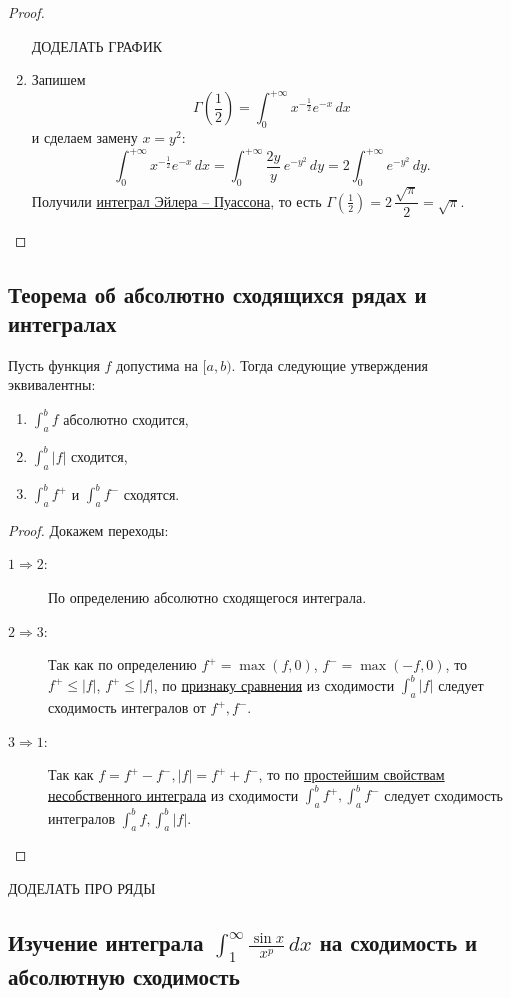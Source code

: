 \begin{proof}
\begin{enumerate}
		ДОДЕЛАТЬ ГРАФИК
		\item Запишем \[
			\Gamma \left(\frac{1}{2} \right) = \int_{0}^{+\infty} x^{-\frac{1}{2}} e^{-x} \, dx
		\]
		и сделаем замену \(x = y^2\): \[
			\int_{0}^{+\infty} x^{-\frac{1}{2}} e^{-x} \, dx = \int_{0}^{+\infty} \frac{2y}{y} \, e^{-y^2} \, dy = 2 \int_{0}^{+\infty} e^{-y^2} \, dy.
		\]
		Получили \hyperlink{puas}{интеграл Эйлера -- Пуассона}, то есть \(\Gamma \left(\frac{1}{2} \right) = 2 \, \dfrac{\sqrt{\pi}}{2} = \sqrt{\pi}\).
	\end{enumerate}
\end{proof}

\subsection{Теорема об абсолютно сходящихся рядах и интегралах}

\begin{theorem} \hypertarget{t42}{}
	Пусть функция \(f\) допустима на \([a, b)\). Тогда следующие утверждения эквивалентны:
	\begin{enumerate}
		\item \(\int_{a}^{b} f\) абсолютно сходится,
		\item \(\int_{a}^{b} |f|\) сходится,
		\item \(\int_{a}^{b} f^+\) и \(\int_{a}^{b} f^-\) сходятся.
	\end{enumerate} 
\end{theorem}
\begin{proof}
	Докажем переходы:
	\begin{description}
		\item[\(1 \Rightarrow 2\):] По определению абсолютно сходящегося интеграла.
		\item[\(2 \Rightarrow 3\):] Так как по определению \(f^+ = \max (f, 0)\), \(f^- = \max (-f, 0)\), то \(f^+ \leqslant |f|\), \(f^+ \leqslant |f|\), по \hyperlink{priz}{признаку сравнения} из сходимости \(\int_{a}^{b} |f|\) следует сходимость интегралов от \(f^+, f^-\).
		\item[\(3 \Rightarrow 1\):] Так как \(f = f^+ - f^-, |f| = f^+ + f^-\), то по \hyperlink{svva}{простейшим свойствам несобственного интеграла} из сходимости \(\int_{a}^{b} f^+, \int_{a}^{b} f^-\) следует сходимость интегралов \(\int_{a}^{b} f, \int_{a}^{b} |f|\).
	\end{description}
\end{proof}

ДОДЕЛАТЬ ПРО РЯДЫ

\subsection{Изучение интеграла $\int_1^{\infty} \frac{\sin x}{x^p} \, dx$ на сходимость и абсолютную сходимость}

